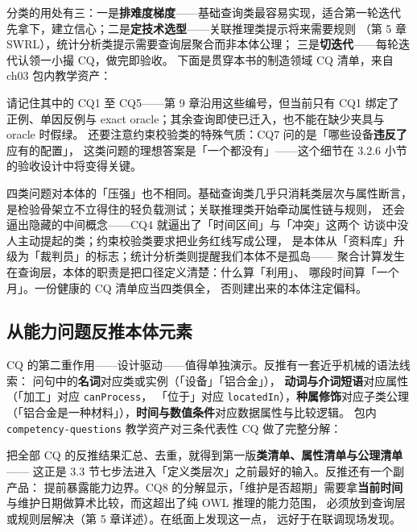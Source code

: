分类的用处有三：一是\textbf{排难度梯度}——基础查询类最容易实现，适合第一轮迭代
先拿下，建立信心；二是\textbf{定技术选型}——关联推理类提示将来需要规则
（第 5 章 SWRL），统计分析类提示需要查询层聚合而非本体公理；
三是\textbf{切迭代}——每轮迭代认领一小撮 CQ，做完即验收。
下面是贯穿本书的制造领域 CQ 清单，来自 ch03 包内教学资产：



请记住其中的 CQ1 至 CQ5——第 9 章沿用这些编号，但当前只有 CQ1 绑定了
正例、单因反例与 exact oracle；其余查询即使已迁入，也不能在缺少夹具与 oracle 时假绿。
还要注意约束校验类的特殊气质：CQ7 问的是「哪些设备\textbf{违反了}应有的配置」，
这类问题的理想答案是「一个都没有」——这个细节在 3.2.6 小节的验收设计中将变得关键。

四类问题对本体的「压强」也不相同。基础查询类几乎只消耗类层次与属性断言，
是检验骨架立不立得住的轻负载测试；关联推理类开始牵动属性链与规则，
还会逼出隐藏的中间概念——CQ4 就逼出了「时间区间」与「冲突」这两个
访谈中没人主动提起的类；约束校验类要求把业务红线写成公理，
是本体从「资料库」升级为「裁判员」的标志；统计分析类则提醒我们本体不是孤岛——
聚合计算发生在查询层，本体的职责是把口径定义清楚：什么算「利用」、
哪段时间算「一个月」。一份健康的 CQ 清单应当四类俱全，
否则建出来的本体注定偏科。

\subsection{从能力问题反推本体元素}

CQ 的第二重作用——设计驱动——值得单独演示。反推有一套近乎机械的语法线索：
问句中的\textbf{名词}对应类或实例（「设备」「铝合金」），
\textbf{动词与介词短语}对应属性（「加工」对应 \texttt{canProcess}，
「位于」对应 \texttt{locatedIn}），\textbf{种属修饰}对应子类公理
（「铝合金是一种材料」），\textbf{时间与数值条件}对应数据属性与比较逻辑。
包内 \texttt{competency-questions} 教学资产对三条代表性 CQ 做了完整分解：



把全部 CQ 的反推结果汇总、去重，就得到第一版\textbf{类清单、属性清单与公理清单}——
这正是 3.3 节七步法进入「定义类层次」之前最好的输入。反推还有一个副产品：
提前暴露能力边界。CQ8 的分解显示，「维护是否超期」需要拿\textbf{当前时间}
与维护日期做算术比较，而这超出了纯 OWL 推理的能力范围，
必须放到查询层或规则层解决（第 5 章详述）。在纸面上发现这一点，
远好于在联调现场发现。


